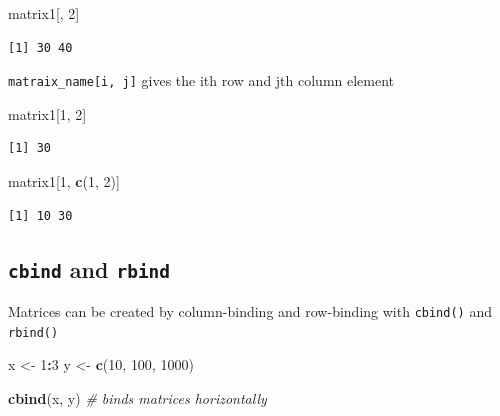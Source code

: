 \documentclass[]{book}
\newenvironment{Shaded}{\begin{snugshade}}{\end{snugshade}}
\newcommand{\CommentTok}[1]{\textcolor[rgb]{0.56,0.35,0.01}{\textit{#1}}}
\newcommand{\DecValTok}[1]{\textcolor[rgb]{0.00,0.00,0.81}{#1}}
\newcommand{\KeywordTok}[1]{\textcolor[rgb]{0.13,0.29,0.53}{\textbf{#1}}}
\newcommand{\NormalTok}[1]{#1}
\newcommand{\OperatorTok}[1]{\textcolor[rgb]{0.81,0.36,0.00}{\textbf{#1}}}
\newcommand{\StringTok}[1]{\textcolor[rgb]{0.31,0.60,0.02}{#1}}
\begin{document}
\begin{Shaded}
\begin{Highlighting}[]
\NormalTok{matrix1[, }\DecValTok{2}\NormalTok{]}
\end{Highlighting}
\end{Shaded}

\begin{verbatim}
[1] 30 40
\end{verbatim}

\texttt{matraix\_name{[}i,\ j{]}} gives the ith row and jth column element

\begin{Shaded}
\begin{Highlighting}[]
\NormalTok{matrix1[}\DecValTok{1}\NormalTok{, }\DecValTok{2}\NormalTok{]}
\end{Highlighting}
\end{Shaded}

\begin{verbatim}
[1] 30
\end{verbatim}

\begin{Shaded}
\begin{Highlighting}[]
\NormalTok{matrix1[}\DecValTok{1}\NormalTok{, }\KeywordTok{c}\NormalTok{(}\DecValTok{1}\NormalTok{, }\DecValTok{2}\NormalTok{)] }
\end{Highlighting}
\end{Shaded}

\begin{verbatim}
[1] 10 30
\end{verbatim}

\hypertarget{cbind-and-rbind}{%
\subsection{\texorpdfstring{\texttt{cbind} and \texttt{rbind}}{cbind and rbind}}\label{cbind-and-rbind}}

Matrices can be created by column-binding and row-binding with \texttt{cbind()} and \texttt{rbind()}

\begin{Shaded}
\begin{Highlighting}[]
\NormalTok{x <-}\StringTok{ }\DecValTok{1}\OperatorTok{:}\DecValTok{3}
\NormalTok{y <-}\StringTok{ }\KeywordTok{c}\NormalTok{(}\DecValTok{10}\NormalTok{, }\DecValTok{100}\NormalTok{, }\DecValTok{1000}\NormalTok{)}

\KeywordTok{cbind}\NormalTok{(x, y) }\CommentTok{# binds matrices horizontally}
\end{Highlighting}
\end{Shaded}
\end{document}
